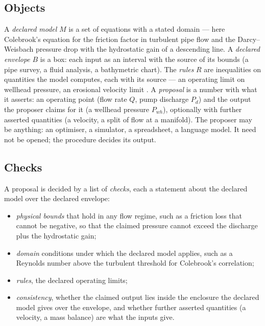 \documentclass[preprint,11pt,authoryear]{elsarticle}
\begin{document}
\subsection{Objects}
A \emph{declared model} $M$ is a set of equations with a stated domain --- here Colebrook's equation for the friction factor in turbulent pipe flow and the Darcy--Weisbach pressure drop with the hydrostatic gain of a descending line. A \emph{declared envelope} $B$ is a box: each input as an interval with the source of its bounds (a pipe survey, a fluid analysis, a bathymetric chart). The \emph{rules} $R$ are inequalities on quantities the model computes, each with its source --- an operating limit on wellhead pressure, an erosional velocity limit \citep{api14e}. A \emph{proposal} is a number with what it asserts: an operating point (flow rate $Q$, pump discharge $P_d$) and the output the proposer claims for it (a wellhead pressure $P_{wh}$), optionally with further asserted quantities (a velocity, a split of flow at a manifold). The proposer may be anything: an optimiser, a simulator, a spreadsheet, a language model. It need not be opened; the procedure decides its output.

\subsection{Checks}
A proposal is decided by a list of \emph{checks}, each a statement about the declared model over the declared envelope:
\begin{itemize}
\item \emph{physical bounds} that hold in any flow regime, such as a friction loss that cannot be negative, so that the claimed pressure cannot exceed the discharge plus the hydrostatic gain;
\item \emph{domain} conditions under which the declared model applies, such as a Reynolds number above the turbulent threshold for Colebrook's correlation;
\item \emph{rules}, the declared operating limits;
\item \emph{consistency}, whether the claimed output lies inside the enclosure the declared model gives over the envelope, and whether further asserted quantities (a velocity, a mass balance) are what the inputs give.
\end{itemize}
\end{document}

